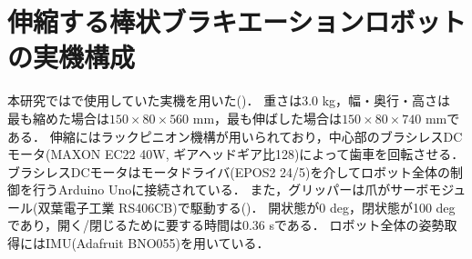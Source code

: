         \section{伸縮する棒状ブラキエーションロボットの実機構成}
          本研究では\cite{Hijiri:Robomech2024}で使用していた実機を用いた()．
          重さは3.0 kg，幅・奥行・高さは
          最も縮めた場合は$150{\times}80{\times}560$ mm，最も伸ばした場合は$150{\times}80{\times}740$ mmである．
          伸縮にはラックピニオン機構が用いられており，中心部のブラシレスDCモータ(MAXON EC22 40W, ギアヘッドギア比128)によって歯車を回転させる．
          ブラシレスDCモータはモータドライバ(EPOS2 24/5)を介してロボット全体の制御を行うArduino Unoに接続されている．
          また，グリッパーは爪がサーボモジュール(双葉電子工業 RS406CB)で駆動する()．
          開状態が0 deg，閉状態が100 degであり，開く/閉じるために要する時間は0.36 sである．
          ロボット全体の姿勢取得にはIMU(Adafruit BNO055)を用いている．
          

            
